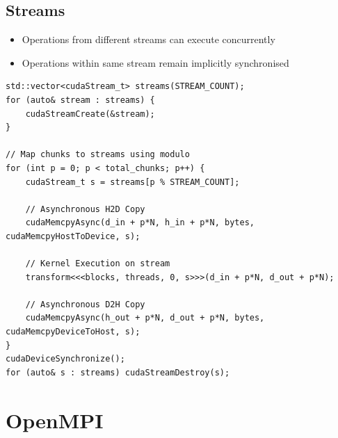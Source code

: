 \documentclass{article}
\begin{document}
\subsection{Streams}
\begin{itemize}
    \item Operations from different streams can execute concurrently
    \item Operations within same stream remain implicitly synchronised
\end{itemize}

\begin{lstlisting}
std::vector<cudaStream_t> streams(STREAM_COUNT);
for (auto& stream : streams) {
    cudaStreamCreate(&stream);
}

// Map chunks to streams using modulo
for (int p = 0; p < total_chunks; p++) {
    cudaStream_t s = streams[p % STREAM_COUNT];

    // Asynchronous H2D Copy
    cudaMemcpyAsync(d_in + p*N, h_in + p*N, bytes, cudaMemcpyHostToDevice, s);

    // Kernel Execution on stream
    transform<<<blocks, threads, 0, s>>>(d_in + p*N, d_out + p*N);

    // Asynchronous D2H Copy
    cudaMemcpyAsync(h_out + p*N, d_out + p*N, bytes, cudaMemcpyDeviceToHost, s);
}
cudaDeviceSynchronize();
for (auto& s : streams) cudaStreamDestroy(s);
\end{lstlisting}

\section{OpenMPI}
\end{document}
